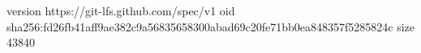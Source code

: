 version https://git-lfs.github.com/spec/v1
oid sha256:fd26fb41aff9ae382c9a56835658300abad69c20fe71bb0ea848357f5285824c
size 43840
